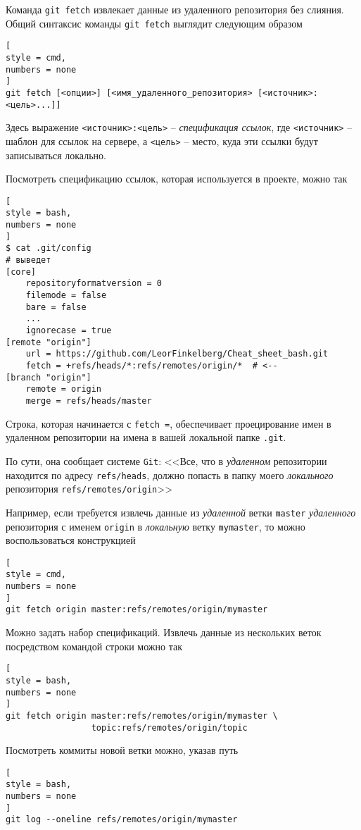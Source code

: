 \documentclass[%
	11pt,
	a4paper,
	utf8,
		]{article}
\begin{document}
Команда \texttt{git fetch} извлекает данные из удаленного репозитория без слияния. Общий синтаксис команды \texttt{git fetch} выглядит следующим образом
\begin{lstlisting}[
style = cmd,
numbers = none
]
git fetch [<опции>] [<имя_удаленного_репозитория> [<источник>:<цель>...]]
\end{lstlisting}

Здесь выражение \verb|<источник>:<цель>| -- \emph{спецификация ссылок}, где \verb|<источник>| -- шаблон для ссылок на сервере, а \verb|<цель>| -- место, куда эти ссылки будут записываться локально.

Посмотреть спецификацию ссылок, которая используется в проекте, можно так
\begin{lstlisting}[
style = bash,
numbers = none
]
$ cat .git/config
# выведет
[core]
    repositoryformatversion = 0
    filemode = false
    bare = false
    ...
    ignorecase = true
[remote "origin"]
    url = https://github.com/LeorFinkelberg/Cheat_sheet_bash.git
    fetch = +refs/heads/*:refs/remotes/origin/*  # <--
[branch "origin"]
    remote = origin
    merge = refs/heads/master
\end{lstlisting}

Строка, которая начинается с \texttt{fetch =}, обеспечивает проецирование имен в удаленном репозитории на имена в вашей локальной папке \texttt{.git}.

По сути, она сообщает системе \texttt{Git}: <<Все, что в \emph{удаленном} репозитории находится по адресу \verb|refs/heads|, должно попасть в папку моего \emph{локального} репозитория \verb|refs/remotes/origin|>>

Например, если требуется извлечь данные из \emph{удаленной} ветки \texttt{master} \emph{удаленного} репозитория с именем \texttt{origin} в \emph{локальную} ветку \texttt{mymaster}, то можно воспользоваться конструкцией
\begin{lstlisting}[
style = cmd,
numbers = none
]
git fetch origin master:refs/remotes/origin/mymaster
\end{lstlisting}

Можно задать набор спецификаций. Извлечь данные из нескольких веток посредством командой строки можно так
\begin{lstlisting}[
style = bash,
numbers = none
]
git fetch origin master:refs/remotes/origin/mymaster \
                 topic:refs/remotes/origin/topic
\end{lstlisting}

Посмотреть коммиты новой ветки можно, указав путь 
\begin{lstlisting}[
style = bash,
numbers = none
]
git log --oneline refs/remotes/origin/mymaster
\end{lstlisting}
\end{document}
